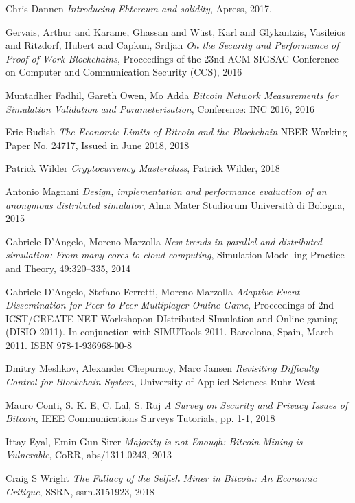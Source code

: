 \begin{thebibliography}{99}
 Chris Dannen
{\em Introducing Ehtereum and solidity},
Apress, 2017.

 Gervais, Arthur and Karame, Ghassan and Wüst, Karl and Glykantzis, Vasileios and Ritzdorf, Hubert and Capkun, Srdjan
{\em On the Security and Performance of Proof of Work Blockchains},
Proceedings of the 23nd ACM SIGSAC Conference on Computer and Communication Security (CCS), 2016

 Muntadher Fadhil, Gareth Owen, Mo Adda
{\em Bitcoin Network Measurements for Simulation Validation and Parameterisation},
Conference: INC 2016, 2016

 Eric Budish
{\em The Economic Limits of Bitcoin and the Blockchain}
NBER Working Paper No. 24717, Issued in June 2018, 2018

 Patrick Wilder
{\em Cryptocurrency Masterclass},
Patrick Wilder, 2018

 Antonio Magnani
{\em Design, implementation and performance evaluation of an anonymous distributed simulator},
Alma Mater Studiorum Università di Bologna, 2015

 Gabriele D'Angelo, Moreno Marzolla
{\em New trends in parallel and distributed simulation: From many-cores to cloud computing},
Simulation Modelling Practice and Theory, 49:320–335, 2014

 Gabriele D'Angelo, Stefano Ferretti, Moreno Marzolla
{\em Adaptive Event Dissemination for Peer-to-Peer Multiplayer Online Game},
Proceedings of 2nd ICST/CREATE-NET Workshopon DIstributed SImulation and Online gaming (DISIO 2011).
In conjunction with SIMUTools 2011. Barcelona, Spain, March 2011. ISBN 978-1-936968-00-8

 Dmitry Meshkov, Alexander Chepurnoy, Marc Jansen
{\em Revisiting Difficulty Control for Blockchain System},
University of Applied Sciences Ruhr West

 Mauro Conti, S. K. E, C. Lal, S. Ruj
{\em A Survey on Security and Privacy Issues of Bitcoin}, 
IEEE Communications Surveys Tutorials, pp. 1-1, 2018

 Ittay Eyal, Emin Gun Sirer
{\em Majority is not Enough: Bitcoin Mining is Vulnerable},
CoRR, abs/1311.0243, 2013

 Craig S Wright
{\em The Fallacy of the Selfish Miner in Bitcoin: An Economic Critique},
SSRN, ssrn.3151923, 2018


\end{thebibliography}
